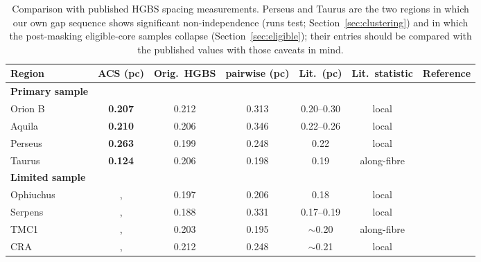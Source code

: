 \documentclass[usenatbib,twoside,twocolumn]{mnras}
\begin{document}
\begin{table}
\caption{Comparison with published HGBS spacing measurements. Perseus and Taurus are the two regions in which our own gap sequence shows significant non-independence (runs test; Section~\ref{sec:clustering}) and in which the post-masking eligible-core samples collapse (Section~\ref{sec:eligible}); their entries should be compared with the published values with those caveats in mind.}
\label{tab:literature}
\setlength{\tabcolsep}{4pt}
\footnotesize
\setlength{\tabcolsep}{2.5pt}
\begin{tabular}{lcccccc}
\toprule
Region & ACS (pc) & Orig.\ HGBS & pairwise (pc) & Lit.\ (pc) & Lit.\ statistic & Reference \\
\midrule
\textbf{Primary sample} &  &  &  &  &  &  \\
Orion B & \textbf{0.207} & 0.212 & 0.313 & 0.20--0.30 & local & \citet{Konyves2020} \\
Aquila  & \textbf{0.210} & 0.206 & 0.346 & 0.22--0.26 & local & \citet{Konyves2015} \\
Perseus & \textbf{0.263} & 0.199 & 0.248 & 0.22 & local & \citet{Pezzuto2021} \\
Taurus  & \textbf{0.124} & 0.206 & 0.198 & 0.19 & along-fibre & \citet{Hacar2013} \\
\midrule
\textbf{Limited sample} &  &  &  &  &  &  \\
Ophiuchus &, & 0.197 & 0.206 & 0.18 & local & \citet{Konyves2020} \\
Serpens  &, & 0.188 & 0.331 & 0.17--0.19 & local & \citet{Konyves2020} \\
TMC1     &, & 0.203 & 0.195 & $\sim$0.20 & along-fibre & \citet{Hacar2013} \\
CRA      &, & 0.212 & 0.248 & $\sim$0.21 & local & \citet{Konyves2020} \\
\bottomrule
\end{tabular}


\end{table}
\end{document}
